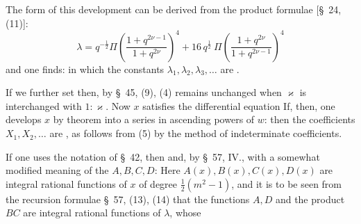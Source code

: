 The form of this development can be derived from the product formulae [\S\ 24, (11)]:
\[
\lambda = q^{-\frac{1}{2}} \Pi\left(\frac{1+q^{2\nu-1}}{1+q^{2\nu}}\right)^4 + 16\,q^{\frac{1}{2}}\ \Pi\left(\frac{1+q^{2\nu}}{1+q^{2\nu-1}}\right)^4
\]
and one finds:
in which the constants $\lambda_1, \lambda_2, \lambda_3, \ldots$ are .

If we further set
then, by \S\ 45, (9), (4) remains unchanged when $\varkappa$ is interchanged with $1:\varkappa$. Now $x$ satisfies the differential equation
If, then, one develops $x$ by  theorem into a series in ascending powers of $w$:
then the coefficients $X_1, X_2, \ldots$ are , as follows from (5) by the method of indeterminate coefficients.

If one uses the notation of \S\ 42, then
and, by \S\ 57, IV., with a somewhat modified meaning of the $A, B, C, D$:
Here $A(x), B(x), C(x), D(x)$ are integral rational functions of $x$ of degree $\frac{1}{2}(m^2-1)$, and it is to be seen from the recursion formulae \S\ 57, (13), (14) that the functions $A, D$ and the product $BC$ are integral rational functions of $\lambda$, whose
